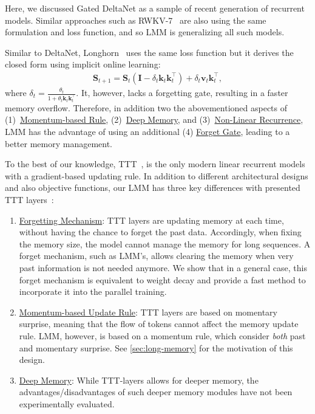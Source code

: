 \documentclass{article}
\newcommand{\citep}{\parencite}
\newcommand{\head}[1]{\vspace{1.7mm}\noindent{{\textcolor{c3}{\bf #1.}}}}
\begin{document}
Here, we discussed Gated DeltaNet as a sample of recent generation of recurrent models. Similar approaches such as RWKV-7~\citep{rwkv-repo} are also using the same formulation and loss function, and so LMM is generalizing all such models.  

\head{LMM is Generalized Longhorn}
Similar to DeltaNet, Longhorn~\citep{liu2024longhorn} uses the same loss function but it derives the closed form using implicit online learning: 
\begin{align}
    \mathbf{S}_{t+1} = \mathbf{S}_{t} \left( \mathbf{I} - \delta_t \mathbf{k}_t\mathbf{k}_t^{\top} \right) + \delta_t \mathbf{v}_t\mathbf{k}^{\top}_t,
\end{align}
where $\delta_t = \frac{\theta_t}{1 + \theta_t \mathbf{k}_t\mathbf{k}_t^{\top}}$.
It, however, lacks a forgetting gate, resulting in a faster memory overflow. Therefore, in addition two the abovementioned aspects of (1)~\underline{Momentum-based Rule}, (2)~\underline{Deep Memory}, and (3)~\underline{Non-Linear Recurrence}, LMM has the advantage of using an additional (4) \underline{Forget Gate}, leading to a better memory management. 

\head{LMM is Generalized TTT Layer}
To the best of our knowledge, TTT~\citep{sun2024learning}, is the only modern linear recurrent models with a gradient-based updating rule. In addition to different architectural designs and also objective functions, our LMM has three key differences with presented TTT layers~\citep{sun2024learning}:
\begin{enumerate}
    \item \underline{Forgetting Mechanism}: TTT layers are updating memory at each time, without having the chance to forget the past data. Accordingly, when fixing the memory size, the model cannot manage the memory for long sequences. A forget mechanism, such as LMM's, allows clearing the memory when very past information is not needed anymore. We show that in a general case, this forget mechanism is equivalent to weight decay and provide a fast method to incorporate it into the parallel training.
    \item \underline{Momentum-based Update Rule}: TTT layers are based on momentary surprise, meaning that the flow of tokens cannot affect the memory update rule. LMM, however, is based on a momentum rule, which consider \emph{both} past and momentary surprise. See \autoref{sec:long-memory} for the motivation of this design.
    \item \underline{Deep Memory}: While TTT-layers allows for deeper memory, the advantages/disadvantages of such deeper memory modules have not been experimentally evaluated.  
\end{enumerate}
\end{document}
